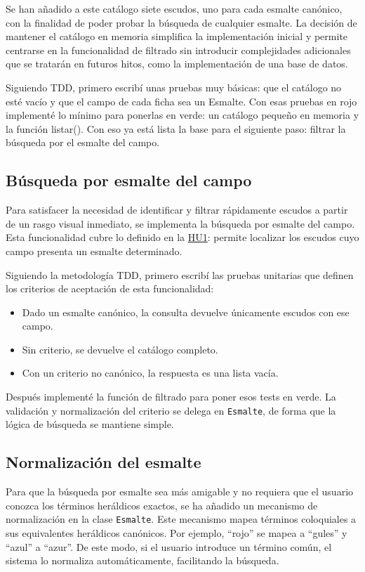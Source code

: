 Se han añadido a este catálogo siete escudos, uno para cada esmalte canónico, con la finalidad de
poder probar la búsqueda de cualquier esmalte. La decisión de mantener el catálogo en memoria
simplifica la implementación inicial y permite centrarse en la funcionalidad de filtrado sin
introducir complejidades adicionales que se tratarán en futuros hitos, como la implementación
de una base de datos.

Siguiendo TDD, primero escribí unas pruebas muy básicas: que el catálogo no esté vacío y que el 
campo de cada ficha sea un Esmalte. Con esas pruebas en rojo implementé lo mínimo para ponerlas en
verde: un catálogo pequeño en memoria y la función listar(). Con eso ya está lista la base para el
siguiente paso: filtrar la búsqueda por el esmalte del campo.

\subsection{Búsqueda por esmalte del campo}
Para satisfacer la necesidad de identificar y filtrar rápidamente escudos a partir de un rasgo visual
inmediato, se implementa la búsqueda por esmalte del campo. Esta funcionalidad cubre lo definido en la
\hyperref[sec:hu1]{HU1}: permite localizar los escudos cuyo campo presenta un esmalte determinado.

Siguiendo la metodología TDD, primero escribí las pruebas unitarias que definen los criterios de
aceptación de esta funcionalidad:

\begin{itemize}
    \item Dado un esmalte canónico, la consulta devuelve únicamente escudos con ese campo.
    \item Sin criterio, se devuelve el catálogo completo.
    \item Con un criterio no canónico, la respuesta es una lista vacía.
\end{itemize}

Después implementé la función de filtrado para poner esos tests en verde. La validación y 
normalización del criterio se delega en \texttt{Esmalte}, de forma que la lógica de
búsqueda se mantiene simple.

\subsection{Normalización del esmalte}
Para que la búsqueda por esmalte sea más amigable y no requiera que el usuario conozca los términos
heráldicos exactos, se ha añadido un mecanismo de normalización en la clase \texttt{Esmalte}. 
Este mecanismo mapea términos coloquiales a sus equivalentes heráldicos canónicos. Por ejemplo,
``rojo'' se mapea a ``gules'' y ``azul'' a ``azur''. De este modo, si el usuario introduce un término común,
el sistema lo normaliza automáticamente, facilitando la búsqueda.